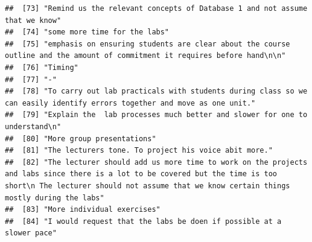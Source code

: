 \documentclass[
]{article}
\begin{document}
\begin{verbatim}
##  [73] "Remind us the relevant concepts of Database 1 and not assume that we know"                                                                                                                                             
##  [74] "some more time for the labs"                                                                                                                                                                                           
##  [75] "emphasis on ensuring students are clear about the course outline and the amount of commitment it requires before hand\n\n"                                                                                             
##  [76] "Timing"                                                                                                                                                                                                                
##  [77] "-"                                                                                                                                                                                                                     
##  [78] "To carry out lab practicals with students during class so we can easily identify errors together and move as one unit."                                                                                                
##  [79] "Explain the  lab processes much better and slower for one to understand\n"                                                                                                                                             
##  [80] "More group presentations"                                                                                                                                                                                              
##  [81] "The lecturers tone. To project his voice abit more."                                                                                                                                                                   
##  [82] "The lecturer should add us more time to work on the projects and labs since there is a lot to be covered but the time is too short\n The lecturer should not assume that we know certain things mostly during the labs"
##  [83] "More individual exercises"                                                                                                                                                                                             
##  [84] "I would request that the labs be doen if possible at a slower pace"                                                                                                                                                    

\end{verbatim}
\end{document}
